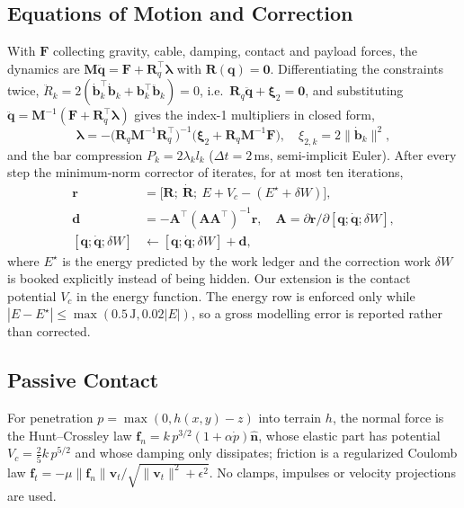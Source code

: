 \documentclass[letterpaper,10pt,conference]{IEEEtran}
\newcommand{\vect}[1]{\boldsymbol{#1}}
\begin{document}
\subsection{Equations of Motion and Correction}
With $\vect F$ collecting gravity, cable, damping, contact and payload
forces, the dynamics are $\vect M\ddot{\vect q}=\vect F+\vect R_q^\top\vect\lambda$
with $\vect R(\vect q)=\vect 0$. Differentiating the constraints twice,
$\ddot R_k=2(\dot{\vect b}_k^\top\dot{\vect b}_k+\vect b_k^\top\ddot{\vect b}_k)=0$,
i.e.\ $\vect R_q\ddot{\vect q}+\vect\xi_2=\vect 0$, and substituting
$\ddot{\vect q}=\vect M^{-1}(\vect F+\vect R_q^\top\vect\lambda)$ gives the
index-1 multipliers in closed form,
\begin{equation}
\vect\lambda=-\big(\vect R_q\vect M^{-1}\vect R_q^\top\big)^{-1}
\big(\vect\xi_2+\vect R_q\vect M^{-1}\vect F\big),\quad
\xi_{2,k}=2\|\dot{\vect b}_k\|^2,
\label{eq:lambda}
\end{equation}
and the bar compression $P_k=2\lambda_k l_k$ ($\Delta t=2$\,ms,
semi-implicit Euler). After every step the minimum-norm corrector of
\cite{nonminimal_preprint} iterates, for at most ten iterations,
\begin{subequations}\label{eq:corr}
\begin{align}
\vect r&=\big[\vect R;\ \dot{\vect R};\ E+V_c-(E^\star+\delta W)\big],\\
\vect d&=-\vect A^\top(\vect A\vect A^\top)^{-1}\vect r,\quad
\vect A=\partial\vect r/\partial[\vect q;\dot{\vect q};\delta W],\\
[\vect q;\dot{\vect q};\delta W]&\leftarrow[\vect q;\dot{\vect q};\delta W]+\vect d,
\end{align}
\end{subequations}
where $E^\star$ is the energy predicted by the work ledger and the
correction work $\delta W$ is booked explicitly instead of being hidden.
Our extension is the contact potential $V_c$ in the energy function. The
energy row is enforced only while $|E-E^\star|\le\max(0.5\,\mathrm{J},0.02|E|)$,
so a gross modelling error is reported rather than corrected.

\subsection{Passive Contact}
For penetration $p=\max(0,h(x,y)-z)$ into terrain $h$, the normal force
is the Hunt--Crossley law \cite{hunt1975coefficient}
$\vect f_n=k\,p^{3/2}(1+\alpha\dot p)\hat{\vect n}$, whose elastic part
has potential $V_c=\tfrac{2}{5}k\,p^{5/2}$ and whose damping only
dissipates; friction is a regularized Coulomb law
$\vect f_t=-\mu\|\vect f_n\|\vect v_t/\sqrt{\|\vect v_t\|^2+\epsilon^2}$.
No clamps, impulses or velocity projections are used.
\end{document}
